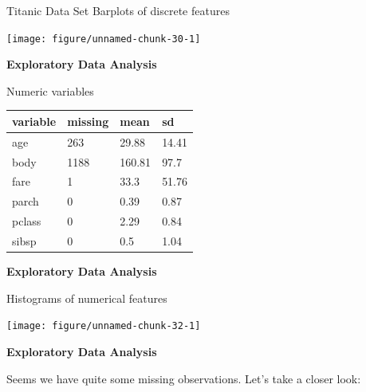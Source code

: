 \documentclass[11pt,compress,t,notes=noshow, xcolor=table]{beamer}
\newenvironment{knitrout}{}{} %
\begin{document}
\begin{vbframe}{Titanic Data Set}
Barplots of discrete features

\begin{knitrout}\tiny
{}\color{fgcolor}

{\centering \texttt{[image: figure/unnamed-chunk-30-1]} 

}



\end{knitrout}


\framebreak

\textbf{Exploratory Data Analysis}


Numeric variables

\begin{table}[H]
\centering\begingroup\fontsize{8}{10}\selectfont

\begin{tabular}{llll}
\toprule
variable & missing & mean & sd\\
\midrule
age & 263 & 29.88 & 14.41\\
body & 1188 & 160.81 & 97.7\\
fare & 1 & 33.3 & 51.76\\
parch & 0 & 0.39 & 0.87\\
pclass & 0 & 2.29 & 0.84\\
sibsp & 0 & 0.5 & 1.04\\
\bottomrule
\end{tabular}\endgroup{}
\end{table}




\framebreak

\textbf{Exploratory Data Analysis}


Histograms of numerical features

\begin{knitrout}\tiny
{}\color{fgcolor}

{\centering \texttt{[image: figure/unnamed-chunk-32-1]} 

}



\end{knitrout}


\framebreak

\textbf{Exploratory Data Analysis}


Seems we have quite some missing observations. Let's take a closer look:

\begin{knitrout}\tiny
{}\color{fgcolor}


\end{knitrout}
\end{vbframe}
\end{document}

